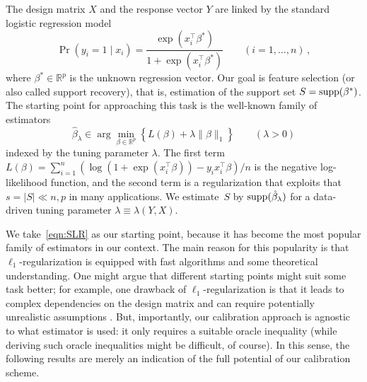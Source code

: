 \documentclass{elsarticle}
\newcommand{\bm}{\mathbf}
\newcommand{\revision}[1]{#1}
\def\T{\top}
\newcommand\norm[1]{\lVert#1\rVert}
\newcommand{\argmin}{\arg\!\min}
\newcommand{\truepara}{{\beta^*}}
\newcommand{\estipara}{{\hat{\beta}}}
\newcommand{\para}{{\beta}}
\newcommand{\tuning}{{\lambda}}
\newcommand{\R}{{\mathbb{R}}}
\newcommand{\redef}{=}
\begin{document}
The design matrix $X$ and the response vector $Y$ are linked by the standard logistic regression model
\begin{equation}\label{eqn:LR}
 \Pr(y_i=1\mid x_{i})=\frac{\exp(x_{i}^\T\truepara)}{1+\exp(x_{i}^\T\truepara)} \qquad (i=1,\ldots,n)\,,
\end{equation}
 where $\truepara\in \R^p$ is the unknown regression vector. Our goal is feature selection (or also called support recovery), that is,  estimation of the support set $S\redef\textnormal{supp}(\truepara)$.  The starting point for approaching this task is the well-known family of estimators
\begin{equation}\label{eqn:SLR}
  \estipara_{\tuning}\in \argmin_{\beta\in \R^p}\left\{L(\para) + \tuning\norm{\beta}_1\right\}\qquad (\tuning>0)
\end{equation}
indexed by the tuning parameter $\tuning.$ The first term $L(\para) \redef \sum_{i=1}^n(\log(1+\exp(x_{i}^\T
\beta))-y_ix_{i}^\T\beta)/n$ is the negative log-likelihood function, and the second term is a regularization that exploits  that  $s=|S|\ll n,p$  in many applications. We estimate~$S$ by $\textnormal{supp}( \estipara_{\tuning})$ for a data-driven tuning parameter $\tuning\equiv\tuning(Y,X)$.

\revision{We take~\eqref{eqn:SLR} as our starting point, because it has become the most popular family of estimators in our context.
The main reason for this popularity is that $\ell_1$-regularization is equipped with fast algorithms and some theoretical understanding.
One might argue that different starting points might suit some task better;
for example, one drawback of $\ell_1$-regularization is that it leads to complex dependencies on the design matrix and can require potentially unrealistic assumptions \cite{dalalyan2017prediction,hebiri2013correlations,lederer2016oracle,van2013lasso,zhuang2018maximum}.
But, importantly, our calibration approach is agnostic to what estimator is used:
it only requires a suitable oracle inequality (while deriving such oracle inequalities might be difficult, of course).
In this sense, the following results are merely an indication of the full potential of our calibration scheme.
}
\end{document}
